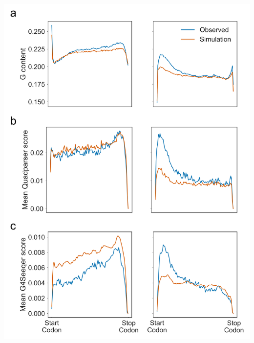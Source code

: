 \documentclass[12pt,a4paper,]{report}
\let\origfigure=\figure
\let\endorigfigure=\endfigure
\renewenvironment{figure}[1][2] {
    \expandafter\origfigure\expandafter[H]
} {
    \endorigfigure
}
\begin{document}
\begin{figure}[htbp]
\centering
\includegraphics[width=\textwidth,height=562pt,keepaspectratio]{chapter_4/figures/reverse_translation.png}
\caption[Reverse Translation Simulation shows that PG4s are enriched at the Start Codon proximal region of the template strand.]{\textbf{Reverse   Translation   Simulation   shows   that   PG4s   are   enriched   at   the   Start   Codon   proximal   region   of   the   template   strand.}   Metagene   profiles   showing   \textbf{a)}   G   content   \textbf{b)}   Quadparser   PG4s   and   \textbf{c)}   G4Seeqer   PG4s   for   real   CDS   regions   (blue)   vs. reverse   translation   simulated   potential   coding   sequences   (PCS)   (orange).   \label{revtrans}}
\end{figure}
\end{document}
